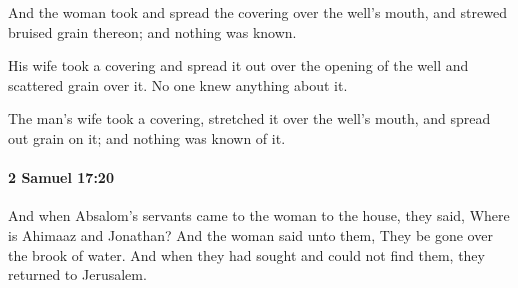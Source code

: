 			\begin{versebox}
					\item[BHS] 
					\item[ASV] And the woman took and spread the covering over the well's mouth, and strewed bruised grain thereon; and nothing was known.
					\item[NIV] His wife took a covering and spread it out over the opening of the well and scattered grain over it. No one knew anything about it.
					\item[NRSV] The man’s wife took a covering, stretched it over the well’s mouth, and spread out grain on it; and nothing was known of it.
			\end{versebox}

		\paragraph{2 Samuel 17:20} %
			\label{2SAMUEL-17-20}

			And when Absalom’s servants came to the woman to the house, they said, Where is Ahimaaz and Jonathan? And the woman said unto them, They be gone over the brook of water. And when they had sought and could not find them, they returned to Jerusalem.

